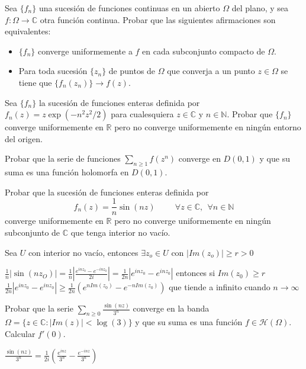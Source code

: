 \begin{ejer}
	Sea $\{f_n\}$ una sucesión de funciones continuas en un abierto $\Omega$ del plano, y sea $f:\Omega\rightarrow\mathbb{C}$ otra función continua. Probar que las siguientes afirmaciones son equivalentes:
	\begin{itemize}
		\item $\{f_n\}$ converge uniformemente a $f$ en cada subconjunto compacto de $\Omega$.
		\item Para toda sucesión $\{z_n\}$ de puntos de $\Omega$ que converja a un punto $z\in\Omega$ se tiene que $\{f_n(z_n)\}\rightarrow f(z)$.
	\end{itemize}
\end{ejer}

\begin{ejer}
	Sea $\{f_n\}$ la sucesión de funciones enteras definida por $f_n(z) = z\exp(-n^2z^2/2)$ para cualesquiera $z\in\mathbb{C}$ y $n\in\mathbb{N}$. Probar que $\{f_n\}$ converge uniformemente en $\mathbb{R}$ pero no converge uniformemente en ningún entorno del origen.
\end{ejer}

\begin{ejer}
	Probar que la serie de funciones $\sum_{n\geq 1} f(z^n)$ converge en $D(0,1)$ y que su suma es una función holomorfa en $D(0,1)$.
\end{ejer}

\begin{ejer}
	Probar que la sucesión de funciones enteras definida por
	$$ f_n(z) = \frac{1}{n}\sin(nz) \hspace{1cm} \forall z\in\mathbb{C}, \ \ \forall n\in\mathbb{N} $$
	converge uniformemente en $\mathbb{R}$ pero no converge uniformemente en ningún subconjunto de $\mathbb{C}$ que tenga interior no vacío.
\end{ejer}
Sea $U$ con interior no vacío, entonces $\exists z_o\in U$ con $|Im(z_o)| \geq r > 0$

$\frac{1}{n}|\sin(nz_O)| = \frac{1}{n}\left| \frac{e^{inz_0}-e^{-inz_0}}{2i} \right|= \frac{1}{2n} \left| e^{inz_0} - e^{inz_0} \right| $
entonces si $Im(z_0)\geq r$
$\frac{1}{2n} \left| e^{inz_0} - e^{inz_0} \right|  \geq \frac{1}{2n} \left( e^{nIm(z_0)} -e^{-nIm(z_0)} \right)  $
que tiende a infinito cuando $n\rightarrow\infty$


\begin{ejer}
	Probar que la serie $\sum_{n\geq 0} \frac{\sin(nz)}{3^n}$ converge en la banda $\Omega = \{ z\in\mathbb{C} : |Im(z)|<\log(3) \}$ y que su suma es una función $f\in\mathcal{H}(\Omega)$. Calcular $f'(0)$.
\end{ejer}
$\frac{\sin(nz)}{3^n} = \frac{1}{2i} \left( \frac{e^{inz}}{3^n} - \frac{e^{-inz}}{3^n} \right)$

